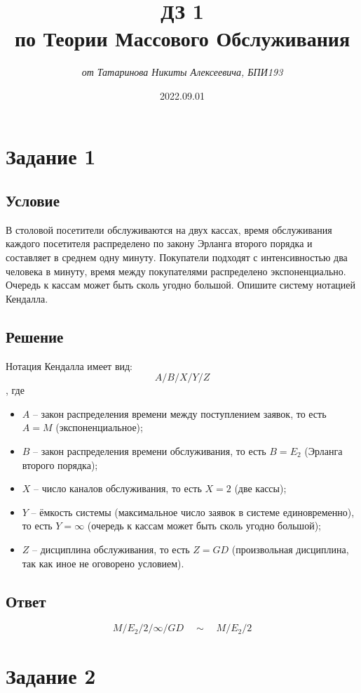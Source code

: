 \documentclass{article}
\title{\textbf{ДЗ 1\\по Теории Массового Обслуживания}}
\author{\textit{от Татаринова Никиты Алексеевича, БПИ193}}
\date{2022.09.01}
\begin{document}
\maketitle
\section*{Задание 1}
\subsection*{Условие}
В столовой посетители обслуживаются на двух кассах, время обслуживания каждого посетителя распределено по закону Эрланга второго порядка и составляет в среднем одну минуту. Покупатели подходят с интенсивностью два человека в минуту, время между покупателями распределено экспоненциально. Очередь к кассам может быть сколь угодно большой.
Опишите систему нотацией Кендалла.
\subsection*{Решение}
Нотация Кендалла имеет вид:
\[ A/B/X/Y/Z \]
, где 
\begin{itemize}
\item $ A $ -- закон распределения времени между поступлением заявок, то есть $ A \! = \! M $ (экспоненциальное);
\item $ B $ -- закон распределения времени обслуживания, то есть $ B \! = \! E_2 $ (Эрланга второго порядка);
\item $ X $ -- число каналов обслуживания, то есть $ X \! = \! 2 $ (две кассы);
\item $ Y $ -- ёмкость системы (максимальное число заявок в системе единовременно), то есть $ Y \! = \! \infty $ (очередь к кассам может быть сколь угодно большой);
\item $ Z $ -- дисциплина обслуживания, то есть $ Z \! = \! GD $ (произвольная дисциплина, так как иное не оговорено условием).
\end{itemize}
\subsection*{Ответ}
\[ M/E_2/2/\infty/GD \quad \sim \quad M/E_2/2 \]
\section*{Задание 2}
\end{document}
